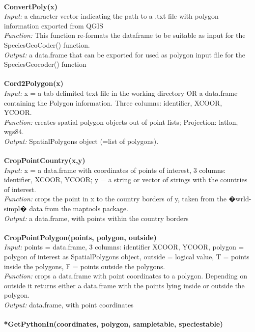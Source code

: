 \documentclass[a4paper,titlepage,11pt]{scrreprt}
\begin{document}
\\
\textbf{ConvertPoly(x)}\\
\textit{Input:} a character vector indicating the path to a .txt file with polygon information exported from QGIS\\
\textit{Function:} This function re-formats the dataframe to be suitable as input for the SpeciesGeoCoder() function.\\
\textit{Output:} a data.frame that can be exported for used as polygon input file for the SpeciesGeocoder() function\\
\\
\textbf{Cord2Polygon(x)}\\
\textit{Input:} x = a tab delimited text file in the working directory OR a data.frame containing the Polygon information. Three columns: identifier, XCOOR, YCOOR.\\
\textit{Function:} creates spatial polygon objects out of point lists; Projection: latlon, wgs84.\\
\textit{Output:} SpatialPolygons object (=list of polygons).\\
\\
\textbf{CropPointCountry(x,y)}\\
\textit{Input:} x = a data.frame with coordinates of points of interest, 3 columns: identifier, XCOOR, YCOOR; y = a string or vector of strings with the countries of interest.\\
\textit{Function:} crops the point in x to the country borders of y, taken from the �wrld-simpl� data from the maptools package.\\
\textit{Output:} a data.frame, with points within the country borders\\
\\
\textbf{CropPointPolygon(points, polygon, outside)}\\
\textit{Input:} points = data.frame, 3 columns: identifier XCOOR, YCOOR, polygon = polygon of interest as SpatialPolygons object, outside = logical value, T = points inside the polygons, F = points outside the polygons.\\
\textit{Function:} crops a data.frame with point coordinates to a polygon. Depending on outside it returns either a data.frame with the points lying inside or outside the polygon.\\
\textit{Output:} data.frame, with point coordinates\\
\\
\textbf{*GetPythonIn(coordinates, polygon, sampletable, speciestable)}\\
\end{document}
